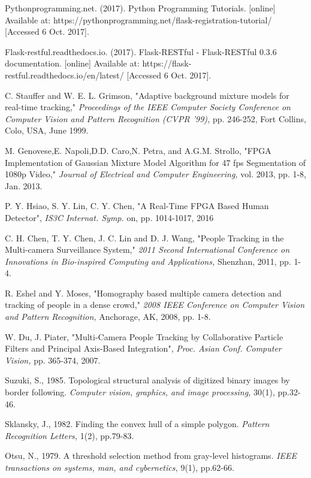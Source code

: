 \documentclass[12pt,a4paper]{report}
\begin{document}
\begin{thebibliography}{10}
Pythonprogramming.net. (2017). Python Programming Tutorials. [online] Available at: https://pythonprogramming.net/flask-registration-tutorial/ [Accessed 6 Oct. 2017].

Flask-restful.readthedocs.io. (2017). Flask-RESTful - Flask-RESTful 0.3.6 documentation. [online] Available at: https://flask-restful.readthedocs.io/en/latest/ [Accessed 6 Oct. 2017].

C. Stauffer and W. E. L. Grimson, "Adaptive background mixture models for real-time tracking," \textit{Proceedings of the IEEE Computer Society Conference on Computer Vision and Pattern Recognition (CVPR '99),} pp. 246-252, Fort Collins, Colo, USA, June 1999. 

M. Genovese,E. Napoli,D.D. Caro,N. Petra, and A.G.M. Strollo, "FPGA Implementation of Gaussian Mixture Model Algorithm for 47 fps Segmentation  of 1080p Video," \textit{Journal  of  Electrical  and  Computer Engineering,} vol. 2013, pp. 1-8, Jan. 2013. 

P. Y. Hsiao, S. Y. Lin, C. Y. Chen, "A Real-Time FPGA Based Human Detector", \textit{IS3C Internat. Symp.} on, pp. 1014-1017, 2016

C. H. Chen, T. Y. Chen, J. C. Lin and D. J. Wang, "People Tracking in the Multi-camera Surveillance System," \textit{2011 Second International Conference on Innovations in Bio-inspired Computing and Applications,} Shenzhan, 2011, pp. 1-4.

R. Eshel and Y. Moses, "Homography based multiple camera detection and tracking of people in a dense crowd," \textit{2008 IEEE Conference on Computer Vision and Pattern Recognition,} Anchorage, AK, 2008, pp. 1-8.

W. Du, J. Piater, "Multi-Camera People Tracking by Collaborative Particle Filters and Principal Axis-Based Integration", \textit{Proc. Asian Conf. Computer Vision,} pp. 365-374, 2007.

Suzuki, S., 1985. Topological structural analysis of digitized binary images by border following. \textit{Computer vision, graphics, and image processing,} 30(1), pp.32-46.

Sklansky, J., 1982. Finding the convex hull of a simple polygon. \textit{Pattern Recognition Letters,} 1(2), pp.79-83.

Otsu, N., 1979. A threshold selection method from gray-level histograms. \textit{IEEE transactions on systems, man, and cybernetics,} 9(1), pp.62-66.


\end{thebibliography}
\end{document}
